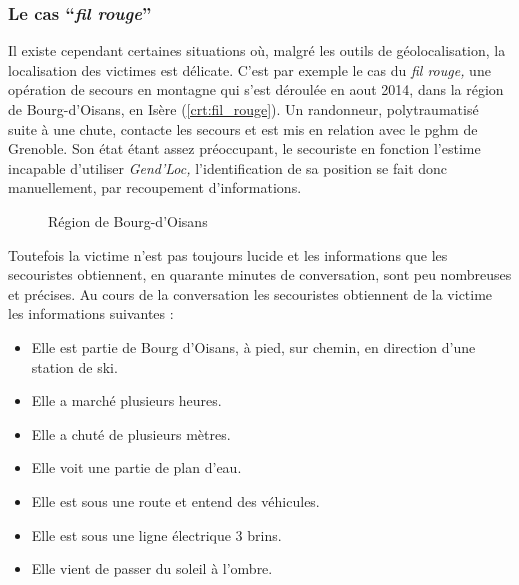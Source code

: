 \subsubsection{Le cas \enquote{\emph{fil rouge}}}
\label{subsec:1-1-2-3}

Il existe cependant certaines situations où, malgré les outils de
géolocalisation, la localisation des victimes est délicate. C'est par
exemple le cas du \emph{fil rouge,} une opération de secours en
montagne qui s'est déroulée en aout 2014, dans la région de
Bourg-d'Oisans, en Isère (\autoref{crt:fil_rouge}). Un randonneur,
polytraumatisé suite à une chute, contacte les secours et est mis en
relation avec le \ac{pghm} de Grenoble. Son état étant assez
préoccupant, le secouriste en fonction l'estime incapable d'utiliser
\emph{Gend'Loc,} l'identification de sa position se fait donc
manuellement, par recoupement d'informations.

\begin{figure}
  \centering
  
  \caption{Région de Bourg-d'Oisans}
  \label{fig:fil_rouge}
\end{figure}

Toutefois la victime n'est pas toujours lucide et les informations que
les secouristes obtiennent, en quarante minutes de conversation, sont
peu nombreuses et précises. Au cours de la conversation les
secouristes obtiennent de la victime les informations suivantes :

\begin{itemize}
\item Elle est partie de Bourg d'Oisans, à pied, sur chemin, en
  direction d'une station de ski.
\item Elle a marché plusieurs heures.
\item Elle a chuté de plusieurs mètres.
\item Elle voit une partie de plan d'eau.
\item Elle est sous une route et entend des véhicules.
\item Elle est sous une ligne électrique 3 brins.
\item Elle vient de passer du soleil à l'ombre.
\end{itemize}

